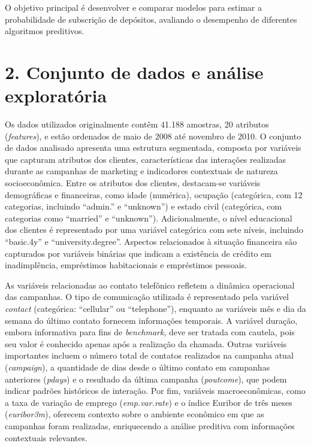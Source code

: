 \documentclass[
  onecolumn]{article}
\begin{document}
O objetivo principal é desenvolver e comparar modelos para estimar a
probabilidade de subscrição de depósitos, avaliando o desempenho de
diferentes algoritmos preditivos.

\section{2. Conjunto de dados e análise
exploratória}\label{conjunto-de-dados-e-anuxe1lise-exploratuxf3ria}

Os dados utilizados originalmente contêm 41.188 amostras, 20 atributos
(\emph{features}), e estão ordenados de maio de 2008 até novembro de
2010. O conjunto de dados analisado apresenta uma estrutura segmentada,
composta por variáveis que capturam atributos dos clientes,
características das interações realizadas durante as campanhas de
marketing e indicadores contextuais de natureza socioeconômica. Entre os
atributos dos clientes, destacam-se variáveis demográficas e
financeiras, como idade (numérica), ocupação (categórica, com 12
categorias, incluindo ``admin.'' e ``unknown'') e estado civil
(categórica, com categorias como ``married'' e ``unknown'').
Adicionalmente, o nível educacional dos clientes é representado por uma
variável categórica com sete níveis, incluindo ``basic.4y'' e
``university.degree''. Aspectos relacionados à situação financeira são
capturados por variáveis binárias que indicam a existência de crédito em
inadimplência, empréstimos habitacionais e empréstimos pessoais.

As variáveis relacionadas ao contato telefônico refletem a dinâmica
operacional das campanhas. O tipo de comunicação utilizada é
representado pela variável \emph{contact} (categórica: ``cellular'' ou
``telephone''), enquanto as variáveis mês e dia da semana do último
contato fornecem informações temporais. A variável duração, embora
informativa para fins de \emph{benchmark}, deve ser tratada com cautela,
pois seu valor é conhecido apenas após a realização da chamada. Outras
variáveis importantes incluem o número total de contatos realizados na
campanha atual (\emph{campaign}), a quantidade de dias desde o último
contato em campanhas anteriores (\emph{pdays}) e o resultado da última
campanha (\emph{poutcome}), que podem indicar padrões históricos de
interação. Por fim, variáveis macroeconômicas, como a taxa de variação
de emprego (\emph{emp.var.rate}) e o índice Euribor de três meses
(\emph{euribor3m}), oferecem contexto sobre o ambiente econômico em que
as campanhas foram realizadas, enriquecendo a análise preditiva com
informações contextuais relevantes.
\end{document}
